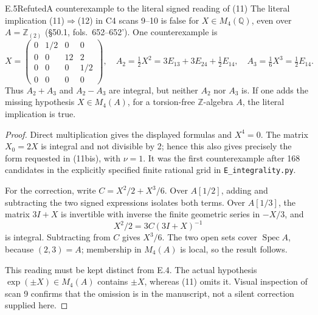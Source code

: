 \begin{statement}{E.5}{Refuted}{A counterexample to the literal signed reading of (11)}
The literal implication (11)\(\Rightarrow\)(12) in C4 scans 9--10 is
false for \(X\in M_4(\mathbb Q)\), even over \(A=\mathbb Z_{(2)}\)
(\S50.1, fols.~652--652').
One counterexample is
\[
 X=\begin{pmatrix}0&1/2&0&0\\0&0&12&2\\0&0&0&1/2\\0&0&0&0\end{pmatrix},
 \quad
 A_2=\tfrac12X^2=3E_{13}+3E_{24}+\tfrac12E_{14},
 \quad A_3=\tfrac16X^3=\tfrac12E_{14}.
\]
Thus \(A_2+A_3\) and \(A_2-A_3\) are integral, but neither \(A_2\)
nor \(A_3\) is.  If one adds the missing hypothesis \(X\in M_4(A)\),
for a torsion-free \(\mathbb Z\)-algebra \(A\), the literal implication
is true.
\end{statement}
\begin{proof}
Direct multiplication gives the displayed formulas and \(X^4=0\).
The matrix \(X_0=2X\) is integral and not divisible by 2; hence this
also gives precisely the form requested in (11bis), with \(\nu=1\).
It was the first counterexample after 168 candidates in the explicitly
specified finite rational grid in \texttt{E\_integrality.py}.

For the correction, write \(C=X^2/2+X^3/6\).  Over \(A[1/2]\),
adding and subtracting the two signed expressions isolates both terms.
Over \(A[1/3]\), the matrix \(3I+X\) is invertible with inverse the
finite geometric series in \(-X/3\), and
\[
                    X^2/2=3C(3I+X)^{-1}
\]
is integral.  Subtracting from \(C\) gives \(X^3/6\).  The two open
sets cover \(\operatorname{Spec}A\), because \((2,3)=A\); membership
in \(M_4(A)\) is local, so the result follows.

This reading must be kept distinct from E.4.  The actual hypothesis
\(\exp(\pm X)\in M_4(A)\) contains \(\pm X\), whereas (11) omits it.
Visual inspection of scan 9 confirms that the omission is in the
manuscript, not a silent correction supplied here.
\end{proof}

